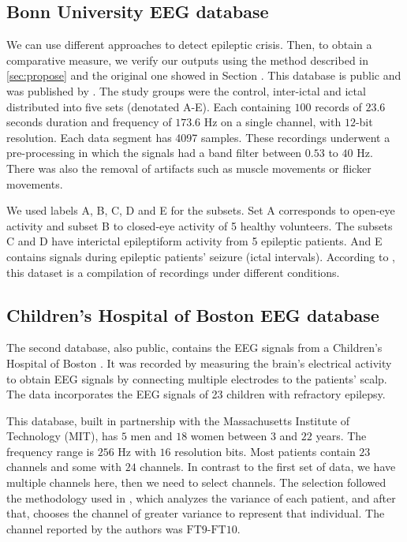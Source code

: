 \subsection{Bonn University EEG database}

We can use different approaches to detect epileptic crisis. Then, to obtain a comparative measure, we verify our outputs using the method described in \ref{sec:propose} and the original one showed in Section \cite{WenZha:2018}. This database is public and was published by \cite{andrzejak}. The study groups were the control, inter-ictal and ictal distributed into five sets (denotated A-E). Each containing $100$ records of $23.6$ seconds duration and frequency of $173.6$ Hz on a single channel, with $12$-bit resolution. Each data segment has 4097 samples. These recordings underwent a pre-processing in which the signals had a band filter between $0.53$ to $40$ Hz. There was also the removal of artifacts such as muscle movements or flicker movements.

We used labels A, B, C, D and E for the subsets. Set A corresponds to open-eye activity and subset B to closed-eye activity of 5 healthy volunteers. The subsets C and D have interictal epileptiform activity from 5 epileptic patients. And E contains signals during epileptic patients' seizure (ictal intervals). According to \cite{kamath2015analysis}, this dataset is a compilation of recordings under different conditions.

\subsection{Children's Hospital of Boston EEG database}

The second database, also public, contains the EEG signals from a Children's Hospital of Boston
\cite{Shoeb}. It was recorded by measuring the brain's electrical activity to obtain EEG signals by connecting multiple electrodes to the patients’ scalp. The data incorporates the EEG signals of 23 children with refractory epilepsy.

This database, built in partnership with the Massachusetts Institute of Technology (MIT), has $5$ men and $18$ women between $3$ and $22$ years. The frequency range is $256$ Hz with $16$ resolution bits. Most patients contain $ 23 $ channels and some with $24$ channels. In contrast to the first set of data, we have multiple channels here, then we need to select channels. The selection followed the methodology used in \cite{shoeb2009application}, which analyzes the variance of each patient, and after that, chooses the channel of greater variance to represent that individual. The channel reported by the authors was $\text{FT9-FT10}$.

